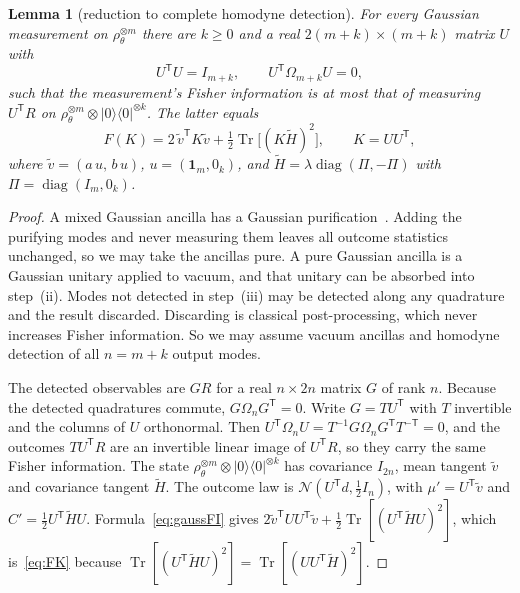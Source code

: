 \documentclass[11pt,a4paper]{article}
\newtheorem{lemma}{Lemma}
\theoremstyle{definition}\newtheorem{definition}{Definition}
\theoremstyle{remark}\newtheorem{remark}{Remark}
\newcommand{\tr}{\operatorname{Tr}}
\newcommand{\diag}{\operatorname{diag}}
\newcommand{\one}{\mathbf 1}
\begin{document}
\begin{lemma}[reduction to complete homodyne detection]\label{lem:reduce}
For every Gaussian measurement on $\rho_\theta^{\otimes m}$ there are $k\ge0$ and a real $2(m+k)\times(m+k)$ matrix $U$ with
\begin{equation}\label{eq:frame}
U^{\mathsf T}U=I_{m+k},\qquad U^{\mathsf T}\Omega_{m+k}U=0,
\end{equation}
such that the measurement's Fisher information is at most that of measuring $U^{\mathsf T}R$ on $\rho_\theta^{\otimes m}\otimes|0\rangle\langle0|^{\otimes k}$. The latter equals
\begin{equation}\label{eq:FK}
F(K)=2\,\tilde v^{\mathsf T}K\tilde v+\tfrac12\tr\!\big[(K\tilde H)^2\big],\qquad K=UU^{\mathsf T},
\end{equation}
where $\tilde v=(a\,u,\,b\,u)$, $u=(\one_m,0_k)$, and $\tilde H=\lambda\diag(\Pi,-\Pi)$ with $\Pi=\diag(I_m,0_k)$.
\end{lemma}

\begin{proof}
A mixed Gaussian ancilla has a Gaussian purification~\cite{Serafini2017}. Adding the purifying modes and never measuring them leaves all outcome statistics unchanged, so we may take the ancillas pure. A pure Gaussian ancilla is a Gaussian unitary applied to vacuum, and that unitary can be absorbed into step~(ii). Modes not detected in step~(iii) may be detected along any quadrature and the result discarded. Discarding is classical post-processing, which never increases Fisher information. So we may assume vacuum ancillas and homodyne detection of all $n=m+k$ output modes.

The detected observables are $GR$ for a real $n\times2n$ matrix $G$ of rank $n$. Because the detected quadratures commute, $G\Omega_nG^{\mathsf T}=0$. Write $G=TU^{\mathsf T}$ with $T$ invertible and the columns of $U$ orthonormal. Then $U^{\mathsf T}\Omega_nU=T^{-1}G\Omega_nG^{\mathsf T}T^{-\mathsf T}=0$, and the outcomes $TU^{\mathsf T}R$ are an invertible linear image of $U^{\mathsf T}R$, so they carry the same Fisher information. The state $\rho_\theta^{\otimes m}\otimes|0\rangle\langle0|^{\otimes k}$ has covariance $I_{2n}$, mean tangent $\tilde v$ and covariance tangent $\tilde H$. The outcome law is $\mathcal N(U^{\mathsf T}d,\tfrac12I_n)$, with $\mu'=U^{\mathsf T}\tilde v$ and $C'=\tfrac12U^{\mathsf T}\tilde HU$. Formula~\eqref{eq:gaussFI} gives $2\tilde v^{\mathsf T}UU^{\mathsf T}\tilde v+\tfrac12\tr[(U^{\mathsf T}\tilde HU)^2]$, which is~\eqref{eq:FK} because $\tr[(U^{\mathsf T}\tilde HU)^2]=\tr[(UU^{\mathsf T}\tilde H)^2]$.
\end{proof}
\end{document}

